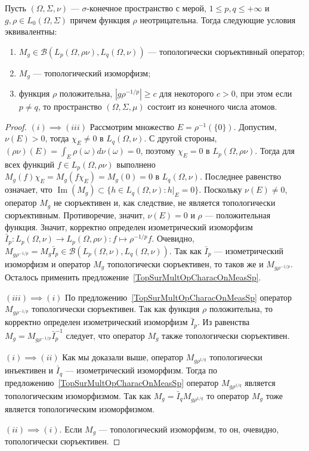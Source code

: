 \begin{proposition}\label{TopSurMultOpCharacBtwnTwoContMeasSp} Пусть
$(\Omega,\Sigma,\nu)$ --- $\sigma$-конечное пространство с мерой, 
$1\leq p,q\leq +\infty$ и $g,\rho\in L_0(\Omega,\Sigma)$ причем функция 
$\rho$  неотрицательна. Тогда следующие условия эквивалентны:

\begin{enumerate}[label = (\roman*)]
    \item $M_g\in\mathcal{B}(L_p(\Omega,\rho \nu),L_q(\Omega,\nu))$ --- 
    топологически сюръективный оператор;

    \item $M_g$ --- топологический изоморфизм;

    \item функция $\rho$ положительна, $|g  \rho^{-1/p}|\geq c$ для некоторого
    $c>0$, при этом если $p\neq q$, то пространство $(\Omega,\Sigma,\mu)$ 
    состоит из конечного числа атомов.
\end{enumerate}
\end{proposition}
\begin{proof} $(i) \implies (iii)$ Рассмотрим множество $E=\rho^{-1}( \{0 \})$.
Допустим, $\nu(E)>0$, тогда $\chi_E\neq 0$ в $L_q(\Omega,\nu)$. С другой
стороны, $(\rho \nu)(E)=\int_E\rho(\omega)d\nu(\omega)=0$, поэтому $\chi_E=0$ в
$L_p(\Omega,\rho \nu)$. Тогда для всех функций $f\in L_p(\Omega,\rho \nu)$
выполнено $M_g(f)\chi_E=M_g(f \chi_E)=M_g(0)=0$ в $L_q(\Omega,\nu)$. Последнее
равенство означает, что 
$\operatorname{Im}(M_g)\subset \{h\in L_q(\Omega,\nu): h|_E=0 \}$. 
Поскольку $\nu(E)\neq 0$, оператор $M_g$ не сюръективен и, как
следствие, не является топологически сюръективным. Противоречие, значит,
$\nu(E)=0$ и $\rho$ --- положительная функция. Значит, корректно определен
изометрический изоморфизм 
$\bar{I}_p:L_p(\Omega,\nu)\to L_p(\Omega,\rho \nu):f\mapsto \rho^{-1/p}  f$. 
Очевидно, 
$M_{g \rho^{-1/p}}
=M_g \bar{I}_p\in\mathcal{B}(L_p(\Omega,\nu),L_q(\Omega,\nu))$. 
Так как $\bar{I}_p$ --- изометрический изоморфизм и оператор $M_g$ 
топологически сюръективен, то таков же и $M_{g  \rho^{-1/p}}$. 
Осталось применить предложение~\ref{TopSurMultOpCharacOnMeasSp}.

$(iii) \implies (i)$ По предложению~\ref{TopSurMultOpCharacOnMeasSp} оператор
$M_{g \rho^{-1/p}}$ топологически сюръективен. Так как функция $\rho$
положительна, то корректно определен изометрический изоморфизм $\bar{I}_p$. Из
равенства $M_g= M_{g \rho^{-1/p}}\bar{I}_p^{-1}$ следует, что оператор $M_g$
также топологически сюръективен.

$(i) \implies (ii)$ Как мы доказали выше, оператор $M_{g \rho^{1/q}}$
топологически инъективен и $\bar{I}_q$ --- изометрический изоморфизм. Тогда по
предложению~\ref{TopSurMultOpCharacOnMeasSp} оператор $M_{g \rho^{1/q}}$
является топологическим изоморфизмом. Так как $M_g=\bar{I}_q M_{g \rho^{1/q}}$
то оператор $M_g$ тоже является топологическим изоморфизмом.

$(ii) \implies (i)$. Если $M_g$ --- топологический изоморфизм, то он, очевидно,
топологически сюръективен.
\end{proof}

